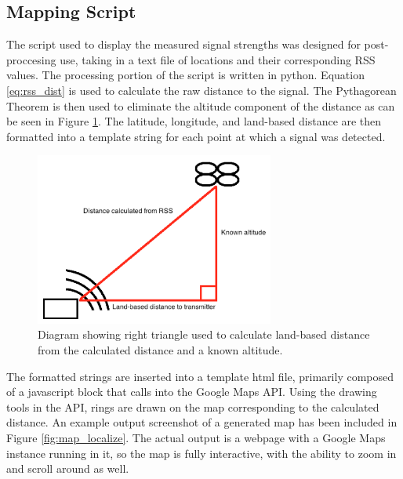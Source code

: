 \subsection{Mapping Script}
The script used to display the measured signal strengths was designed for post-proccesing use, taking in a text file of locations and their corresponding RSS values. The processing portion of the script is written in python. Equation \ref{eq:rss_dist} is used to calculate the raw distance to the signal. The Pythagorean Theorem is then used to eliminate the altitude component of the distance as can be seen in Figure \ref{fig:dist_pyth}. %
The latitude, longitude, and land-based distance are then formatted into a template string for each point at which a signal was detected.\par
\begin{figure}[ht]
\centering
\includegraphics[width=0.70\textwidth]{img/distance_pythag_diagram.png}
\caption{Diagram showing right triangle used to calculate land-based distance from the calculated distance and a known altitude.}
\label{fig:dist_pyth}
\end{figure}
The formatted strings are inserted into a template html file, primarily composed of a javascript block that calls into the Google Maps API. Using the drawing tools in the API, rings are drawn on the map corresponding to the calculated distance. An example output screenshot of a generated map has been included in Figure \ref{fig:map_localize}. The actual output is a webpage with a Google Maps instance running in it, so the map is fully interactive, with the ability to zoom in and scroll around as well.
